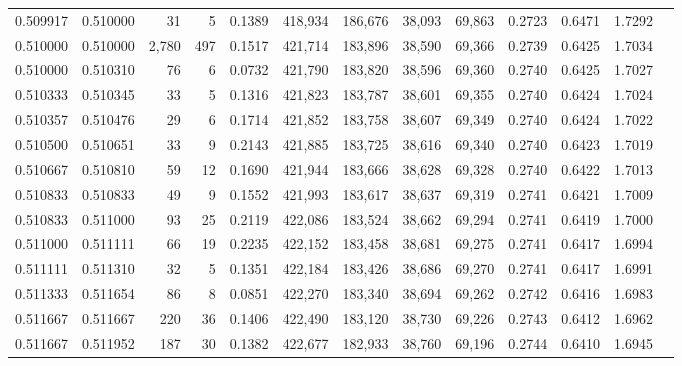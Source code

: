 \begin{tabular}{rrrrrrrrrrrrr}
0.509917 & 0.510000 &    31 &   5 &                                     0.1389 & 418,934 & 186,676 &  38,093 &  69,863 & 0.2723 & 0.6471 & 1.7292 \\
0.510000 & 0.510000 & 2,780 & 497 &                                     0.1517 & 421,714 & 183,896 &  38,590 &  69,366 & 0.2739 & 0.6425 & 1.7034 \\
0.510000 & 0.510310 &    76 &   6 &                                     0.0732 & 421,790 & 183,820 &  38,596 &  69,360 & 0.2740 & 0.6425 & 1.7027 \\
0.510333 & 0.510345 &    33 &   5 &                                     0.1316 & 421,823 & 183,787 &  38,601 &  69,355 & 0.2740 & 0.6424 & 1.7024 \\
0.510357 & 0.510476 &    29 &   6 &                                     0.1714 & 421,852 & 183,758 &  38,607 &  69,349 & 0.2740 & 0.6424 & 1.7022 \\
0.510500 & 0.510651 &    33 &   9 &                                     0.2143 & 421,885 & 183,725 &  38,616 &  69,340 & 0.2740 & 0.6423 & 1.7019 \\
0.510667 & 0.510810 &    59 &  12 &                                     0.1690 & 421,944 & 183,666 &  38,628 &  69,328 & 0.2740 & 0.6422 & 1.7013 \\
0.510833 & 0.510833 &    49 &   9 &                                     0.1552 & 421,993 & 183,617 &  38,637 &  69,319 & 0.2741 & 0.6421 & 1.7009 \\
0.510833 & 0.511000 &    93 &  25 &                                     0.2119 & 422,086 & 183,524 &  38,662 &  69,294 & 0.2741 & 0.6419 & 1.7000 \\
0.511000 & 0.511111 &    66 &  19 &                                     0.2235 & 422,152 & 183,458 &  38,681 &  69,275 & 0.2741 & 0.6417 & 1.6994 \\
0.511111 & 0.511310 &    32 &   5 &                                     0.1351 & 422,184 & 183,426 &  38,686 &  69,270 & 0.2741 & 0.6417 & 1.6991 \\
0.511333 & 0.511654 &    86 &   8 &                                     0.0851 & 422,270 & 183,340 &  38,694 &  69,262 & 0.2742 & 0.6416 & 1.6983 \\
0.511667 & 0.511667 &   220 &  36 &                                     0.1406 & 422,490 & 183,120 &  38,730 &  69,226 & 0.2743 & 0.6412 & 1.6962 \\
0.511667 & 0.511952 &   187 &  30 &                                     0.1382 & 422,677 & 182,933 &  38,760 &  69,196 & 0.2744 & 0.6410 & 1.6945 \\

\end{tabular}
